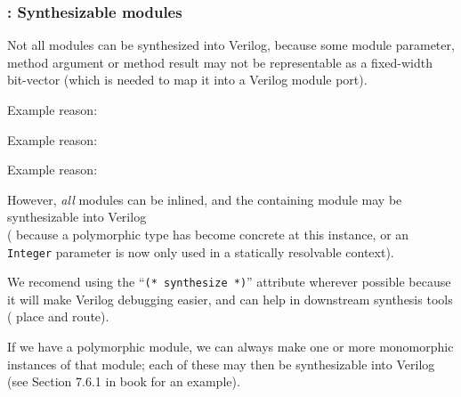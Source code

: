 \begin{frame}[fragile]
\frametitle{{\BSV}: Synthesizable modules}

\footnotesize

Not all {\BSV} modules can be synthesized into Verilog, because some
module parameter, method argument or method result may not be
representable as a fixed-width bit-vector (which is needed to map it
into a Verilog module port).

\vspace{2ex}

Example reason: \hm
{}

Example reason: \hm
{}

Example reason: \hm
{}

\vspace{1ex}

\PAUSE{\vspace{2ex}}

However, \emph{all} {\BSV} modules can be inlined, and the containing
module may be synthesizable into Verilog \\
({\eg} because a polymorphic type has become concrete at this
instance, or an {\tt Integer} parameter is now only used in a
statically resolvable context).

\PAUSE{\vspace{2ex}}

We recomend using the ``{\tt (* synthesize *)}'' attribute wherever
possible because it will make Verilog debugging easier, and can help
in downstream synthesis tools ({\eg} place and route).

\PAUSE{\vspace{2ex}}

If we have a polymorphic module, we can always make one or more
monomorphic instances of that module; each of these may then be
synthesizable into Verilog (see Section 7.6.1 in book for an example).

\end{frame}

